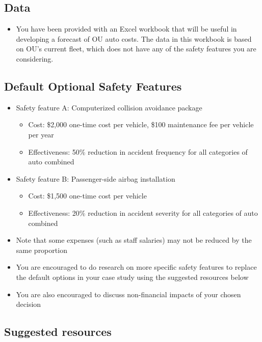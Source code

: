 \documentclass[12pt]{article}
\begin{document}
\subsection{Data}

\begin{itemize}
\item You have been provided with an Excel workbook that will be useful in developing a forecast of OU auto costs. The data in this workbook is based on OU's current fleet, which does not have any of the safety features you are considering.
\end{itemize}

\subsection{Default Optional Safety Features}

\begin{itemize}
\item Safety feature A: Computerized collision avoidance package
\begin{itemize}
\item Cost: \$2,000 one-time cost per vehicle, \$100 maintenance fee per vehicle per year
\item Effectiveness: 50\% reduction in accident frequency for all categories of auto combined
\end{itemize}
\item Safety feature B: Passenger-side airbag installation
\begin{itemize}
\item Cost: \$1,500 one-time cost per vehicle
\item Effectiveness: 20\% reduction in accident severity for all categories of auto combined
\end{itemize}
\item Note that some expenses (such as staff salaries) may not be reduced by the same proportion
\item You are encouraged to do research on more specific safety features to replace the default options in your case study using the suggested resources below
\item You are also encouraged to discuss non-financial impacts of your chosen decision
\end{itemize}

\subsection{Suggested resources}
\end{document}
